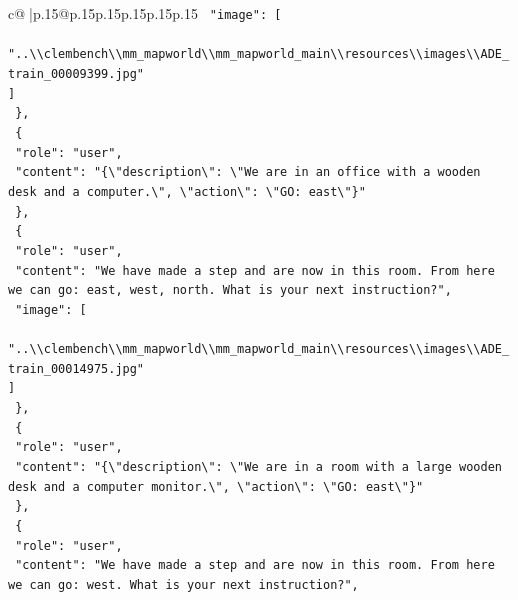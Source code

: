 \documentclass{article}
\begin{document}
{\begin{supertabular}{c@{$\;$}|p{.15\linewidth}@{}p{.15\linewidth}p{.15\linewidth}p{.15\linewidth}p{.15\linewidth}p{.15\linewidth}}
{{{\texttt{    "image": {[}} \\
\texttt{      "..\textbackslash{}\textbackslash{}clembench\textbackslash{}\textbackslash{}mm\_mapworld\textbackslash{}\textbackslash{}mm\_mapworld\_main\textbackslash{}\textbackslash{}resources\textbackslash{}\textbackslash{}images\textbackslash{}\textbackslash{}ADE\_train\_00009399.jpg"} \\
\texttt{    {]}} \\
\texttt{  \},} \\
\texttt{  \{} \\
\texttt{    "role": "user",} \\
\texttt{    "content": "\{\textbackslash{}"description\textbackslash{}": \textbackslash{}"We are in an office with a wooden desk and a computer.\textbackslash{}", \textbackslash{}"action\textbackslash{}": \textbackslash{}"GO: east\textbackslash{}"\}"} \\
\texttt{  \},} \\
\texttt{  \{} \\
\texttt{    "role": "user",} \\
\texttt{    "content": "We have made a step and are now in this room. From here we can go: east, west, north. What is your next instruction?",} \\
\texttt{    "image": {[}} \\
\texttt{      "..\textbackslash{}\textbackslash{}clembench\textbackslash{}\textbackslash{}mm\_mapworld\textbackslash{}\textbackslash{}mm\_mapworld\_main\textbackslash{}\textbackslash{}resources\textbackslash{}\textbackslash{}images\textbackslash{}\textbackslash{}ADE\_train\_00014975.jpg"} \\
\texttt{    {]}} \\
\texttt{  \},} \\
\texttt{  \{} \\
\texttt{    "role": "user",} \\
\texttt{    "content": "\{\textbackslash{}"description\textbackslash{}": \textbackslash{}"We are in a room with a large wooden desk and a computer monitor.\textbackslash{}", \textbackslash{}"action\textbackslash{}": \textbackslash{}"GO: east\textbackslash{}"\}"} \\
\texttt{  \},} \\
\texttt{  \{} \\
\texttt{    "role": "user",} \\
\texttt{    "content": "We have made a step and are now in this room. From here we can go: west. What is your next instruction?",} \\
}}}
\end{supertabular}}
\end{document}
